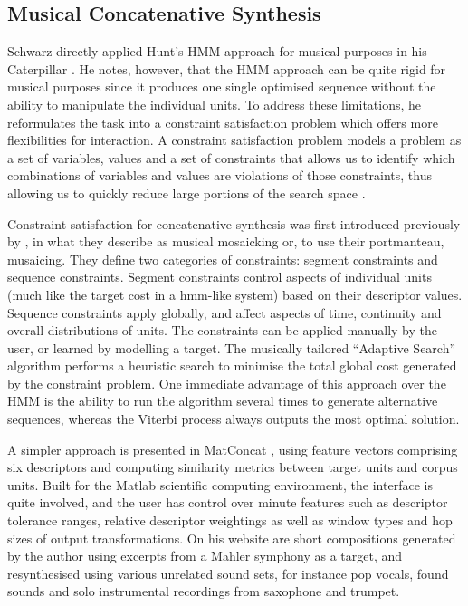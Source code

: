 \subsection{Musical Concatenative Synthesis}
 
Schwarz directly applied Hunt’s HMM approach for musical purposes in his Caterpillar \citep{Schwarz2003}. He notes, however, that the HMM approach can be quite rigid for musical purposes since it produces one single optimised sequence without the ability to manipulate the individual units. To address these limitations, he reformulates the task into a constraint satisfaction problem which offers more flexibilities for interaction. A constraint satisfaction problem models a problem as a set of variables, values and a set of constraints that allows us to identify which combinations of variables and values are violations of those constraints, thus allowing us to quickly reduce large portions of the search space \citep{Russell2002}. 

Constraint satisfaction for concatenative synthesis was first introduced previously by \cite{Zils2001}, in what they describe as musical mosaicking or, to use their portmanteau, musaicing. They define two categories of constraints: segment constraints and sequence constraints. Segment constraints control aspects of individual units (much like the target cost in a \acrshort{hmm}-like system) based on their descriptor values. Sequence constraints apply globally, and affect aspects of time, continuity and overall distributions of units. The constraints can be applied manually by the user, or learned by modelling a target. The musically tailored “Adaptive Search” algorithm performs a heuristic search to minimise the total global cost generated by the constraint problem. One immediate advantage of this approach over the HMM is the ability to run the algorithm several times to generate alternative sequences, whereas the Viterbi process always outputs the most optimal solution.

 A simpler approach is presented in MatConcat \citep{Sturm2004}, using feature vectors comprising six descriptors and computing similarity metrics between target units and corpus units. Built for the Matlab scientific computing environment, the interface is quite involved, and the user has control over minute features such as descriptor tolerance ranges, relative descriptor weightings as well as window types and hop sizes of output transformations. On his website are short compositions generated by the author using excerpts from a Mahler symphony as a target, and resynthesised using various unrelated sound sets, for instance pop vocals, found sounds and solo instrumental recordings from saxophone and trumpet.

